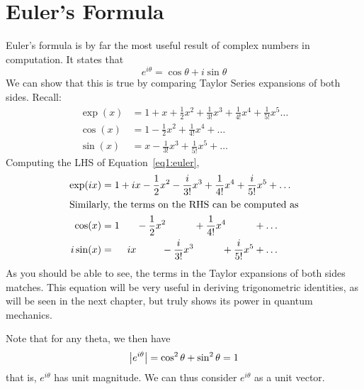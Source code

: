 \section{Euler's Formula}
Euler's formula is by far the most useful result of complex numbers in computation. It states that
\begin{equation}
	e^{i\theta} = \cos\theta + i\sin\theta \label{eq1:euler}
\end{equation}
We can show that this is true by comparing Taylor Series expansions of both sides. Recall:
\begin{align*}
	\exp(x) &= 1 + x + \frac{1}{2}x^2 + \frac{1}{3!} x^3+\frac{1}{4!}x^4+\frac{1}{5!}x^5\dots\\
	\cos(x) &= 1 - \frac{1}{2}x^2 + \frac{1}{4!}x^4+\dots\\
	\sin(x) &= x - \frac{1}{3!}x^3+\frac{1}{5!}x^5+\dots
\end{align*}
Computing the LHS of Equation~\ref{eq1:euler},
\begin{align*}
	\exp(ix) &= 1 + ix -\frac{1}{2}x^2 - \frac{i}{3!} x^3 + \frac{1}{4!}x^4 + \frac{i}{5!}x^5+\dots\\
	\intertext{Similarly, the terms on the RHS can be computed as}
	\cos(x)&=1\hphantom{+ix}-\frac{1}{2}x^2\hphantom{-\frac{i}{3!}x^3}+\frac{1}{4!}x^4\hphantom{+\frac{i}{5!}x^5}+\dots\\
	i\sin(x)&=\hphantom{1+}ix\hphantom{-\frac{1}{2}x^2}-\frac{i}{3!}x^3\hphantom{+\frac{1}{4!}x^4}+\frac{i}{5!}x^5+\dots
\end{align*}
As you should be able to see, the terms in the Taylor expansions of both sides matches. This equation will be very useful in deriving trigonometric identities, as will be seen in the next chapter, but truly shows its power in quantum mechanics.

Note that for any theta, we then have
\[\left|e^{i\theta}\right| = \cos^2\theta + \sin^2\theta = 1\]
that is, \(e^{i\theta}\) has unit magnitude. We can thus consider \(e^{i\theta}\) as a unit vector.

